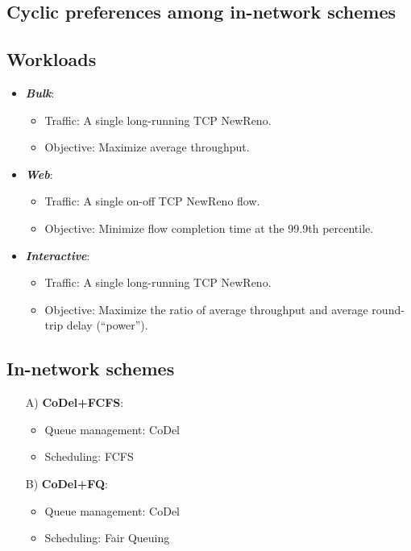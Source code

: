 {\begin{multicols}{2}
\section*{Cyclic preferences among in-network schemes}
\subsection*{Workloads}
\begin{itemize}

\item \textbf{\emph{Bulk}}: 
  \begin{itemize}
  \item Traffic: A single long-running TCP NewReno.
  \item Objective: Maximize average throughput.
  \end{itemize}

\item \textbf{\emph{Web}}:
  \begin{itemize}
  \item Traffic: A single on-off TCP NewReno flow.
  \item Objective: Minimize flow completion time at the 99.9th percentile.
  \end{itemize}

\item \textbf{\emph{Interactive}}:
  \begin{itemize}
  \item Traffic: A single long-running TCP NewReno.
  \item Objective: Maximize the ratio of average throughput and average
  round-trip delay (``power'').
  \end{itemize}

\end{itemize}


\subsection*{In-network schemes}
\begin{enumerate}

\item[A)] {\bf CoDel+FCFS}:
  \begin{itemize}
  \item Queue management: CoDel
  \item Scheduling: FCFS
  \end{itemize}

\item[B)] {\bf CoDel+FQ}:
  \begin{itemize}
  \item Queue management: CoDel
  \item Scheduling: Fair Queuing
  \end{itemize}


\end{enumerate}
\end{multicols}}
